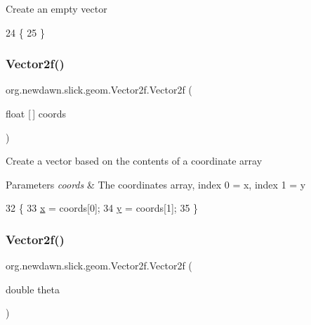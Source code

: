 Create an empty vector 
\begin{DoxyCode}
24                       \{
25     \}
\end{DoxyCode}
\mbox{\label{classorg_1_1newdawn_1_1slick_1_1geom_1_1_vector2f_add8354d0badd945a429e6359d1587073}} 
\subsubsection{\texorpdfstring{Vector2f()}{Vector2f()}\hspace{0.1cm}{\footnotesize\ttfamily [2/5]}}
{\footnotesize\ttfamily org.\+newdawn.\+slick.\+geom.\+Vector2f.\+Vector2f (\begin{DoxyParamCaption}\item[{float \mbox{[}$\,$\mbox{]}}]{coords }\end{DoxyParamCaption})\hspace{0.3cm}{\ttfamily [inline]}}

Create a vector based on the contents of a coordinate array


\begin{DoxyParams}{Parameters}
{\em coords} & The coordinates array, index 0 = x, index 1 = y \\
\hline
\end{DoxyParams}

\begin{DoxyCode}
32                                     \{
33         \mbox{\hyperlink{classorg_1_1newdawn_1_1slick_1_1geom_1_1_vector2f_a3c72cdf13ebc511a472e1a02002fa579}{x}} = coords[0];
34         \mbox{\hyperlink{classorg_1_1newdawn_1_1slick_1_1geom_1_1_vector2f_aa03914f0c3d32063aa90e5bd7b74688e}{y}} = coords[1];
35     \}
\end{DoxyCode}
\mbox{\label{classorg_1_1newdawn_1_1slick_1_1geom_1_1_vector2f_a6c1b8e42325a719e2eae4ead5a943f9a}} 
\subsubsection{\texorpdfstring{Vector2f()}{Vector2f()}\hspace{0.1cm}{\footnotesize\ttfamily [3/5]}}
{\footnotesize\ttfamily org.\+newdawn.\+slick.\+geom.\+Vector2f.\+Vector2f (\begin{DoxyParamCaption}\item[{double}]{theta }\end{DoxyParamCaption})\hspace{0.3cm}{\ttfamily [inline]}}

